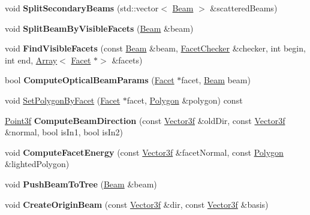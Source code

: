 \begin{DoxyCompactItemize}
\mbox{\label{class_scattering_aee7284ceaca09534124e9a204897745c}} 
void {\bfseries Split\+Secondary\+Beams} (std\+::vector$<$ \mbox{\hyperlink{class_beam}{Beam}} $>$ \&scattered\+Beams)
\item 
\mbox{\label{class_scattering_a122537e571cab317861d6dd37a4ce5bf}} 
void {\bfseries Split\+Beam\+By\+Visible\+Facets} (\mbox{\hyperlink{class_beam}{Beam}} \&beam)
\item 
\mbox{\label{class_scattering_ad6ca3dd6451a0d0976ba593cdf68c0f4}} 
void {\bfseries Find\+Visible\+Facets} (const \mbox{\hyperlink{class_beam}{Beam}} \&beam, \mbox{\hyperlink{class_facet_checker}{Facet\+Checker}} \&checker, int begin, int end, \mbox{\hyperlink{class_array}{Array}}$<$ \mbox{\hyperlink{class_facet}{Facet}} $\ast$$>$ \&facets)
\item 
\mbox{\label{class_scattering_ac80e5b8c758fcf6c04d6af47b7c87a56}} 
bool {\bfseries Compute\+Optical\+Beam\+Params} (\mbox{\hyperlink{class_facet}{Facet}} $\ast$facet, \mbox{\hyperlink{class_beam}{Beam}} beam)
\item 
void \mbox{\hyperlink{class_scattering_abdf7a6563ec37996654fa59ab99bab3f}{Set\+Polygon\+By\+Facet}} (\mbox{\hyperlink{class_facet}{Facet}} $\ast$facet, \mbox{\hyperlink{class_polygon}{Polygon}} \&polygon) const
\item 
\mbox{\label{class_scattering_acccb70145215368218d90cf4bd93b63b}} 
\mbox{\hyperlink{struct_point3f}{Point3f}} {\bfseries Compute\+Beam\+Direction} (const \mbox{\hyperlink{struct_point3f}{Vector3f}} \&old\+Dir, const \mbox{\hyperlink{struct_point3f}{Vector3f}} \&normal, bool is\+In1, bool is\+In2)
\item 
\mbox{\label{class_scattering_ac1b11b96eaa2a09c4595f4d0f65c5dbe}} 
void {\bfseries Compute\+Facet\+Energy} (const \mbox{\hyperlink{struct_point3f}{Vector3f}} \&facet\+Normal, const \mbox{\hyperlink{class_polygon}{Polygon}} \&lighted\+Polygon)
\item 
\mbox{\label{class_scattering_a005cde1e87267a9e4c009958d6ee311a}} 
void {\bfseries Push\+Beam\+To\+Tree} (\mbox{\hyperlink{class_beam}{Beam}} \&beam)
\item 
\mbox{\label{class_scattering_aacb21df97d1762f127b78da0cb2471a2}} 
void {\bfseries Create\+Origin\+Beam} (const \mbox{\hyperlink{struct_point3f}{Vector3f}} \&dir, const \mbox{\hyperlink{struct_point3f}{Vector3f}} \&basis)
\end{DoxyCompactItemize}
